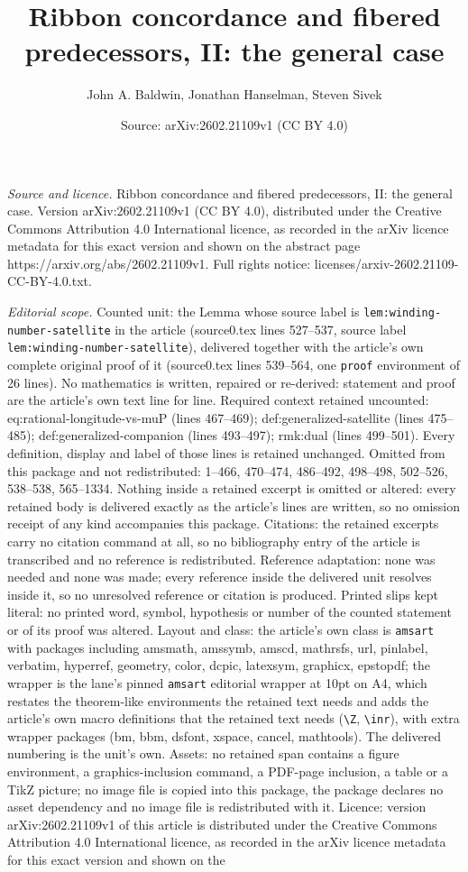 \documentclass[10pt,a4paper]{amsart}
\title[Ribbon concordance and fibered predecessors, II: the general]{Ribbon concordance and fibered predecessors, II: the general case}
\author{John A. Baldwin, Jonathan Hanselman, Steven Sivek}
\date{Source: arXiv:2602.21109v1 (CC BY 4.0)}
\begin{document}
\maketitle

\noindent\emph{Source and licence.} Ribbon concordance and fibered predecessors, II: the general case. Version arXiv:2602.21109v1 (CC BY 4.0), distributed under the Creative Commons Attribution 4.0 International licence, as recorded in the arXiv licence metadata for this exact version and shown on the abstract page https://arxiv.org/abs/2602.21109v1. Full rights notice: licenses/arxiv-2602.21109-CC-BY-4.0.txt.\par\smallskip

\noindent\textit{Editorial scope.} Counted unit: the Lemma whose source label is \texttt{lem:winding-number-satellite} in the article (source0.tex lines 527--537, source label \texttt{lem:winding-number-satellite}), delivered together with the article's own complete original proof of it (source0.tex lines 539--564, one \texttt{proof} environment of 26 lines). No mathematics is written, repaired or re-derived: statement and proof are the article's own text line for line. Required context retained uncounted: eq:rational-longitude-vs-muP (lines 467--469); def:generalized-satellite (lines 475--485); def:generalized-companion (lines 493--497); rmk:dual (lines 499--501). Every definition, display and label of those lines is retained unchanged. Omitted from this package and not redistributed: 1--466, 470--474, 486--492, 498--498, 502--526, 538--538, 565--1334. Nothing inside a retained excerpt is omitted or altered: every retained body is delivered exactly as the article's lines are written, so no omission receipt of any kind accompanies this package. Citations: the retained excerpts carry no citation command at all, so no bibliography entry of the article is transcribed and no reference is redistributed. Reference adaptation: none was needed and none was made; every reference inside the delivered unit resolves inside it, so no unresolved reference or citation is produced. Printed slips kept literal: no printed word, symbol, hypothesis or number of the counted statement or of its proof was altered. Layout and class: the article's own class is \texttt{amsart} with packages including amsmath, amssymb, amscd, mathrsfs, url, pinlabel, verbatim, hyperref, geometry, color, dcpic, latexsym, graphicx, epstopdf; the wrapper is the lane's pinned \texttt{amsart} editorial wrapper at 10pt on A4, which restates the theorem-like environments the retained text needs and adds the article's own macro definitions that the retained text needs (\texttt{\textbackslash Z}, \texttt{\textbackslash inr}), with extra wrapper packages (bm, bbm, dsfont, xspace, cancel, mathtools). The delivered numbering is the unit's own. Assets: no retained span contains a figure environment, a graphics-inclusion command, a PDF-page inclusion, a table or a TikZ picture; no image file is copied into this package, the package declares no asset dependency and no image file is redistributed with it. Licence: version arXiv:2602.21109v1 of this article is distributed under the Creative Commons Attribution 4.0 International licence, as recorded in the arXiv licence metadata for this exact version and shown on the 
\end{document}
